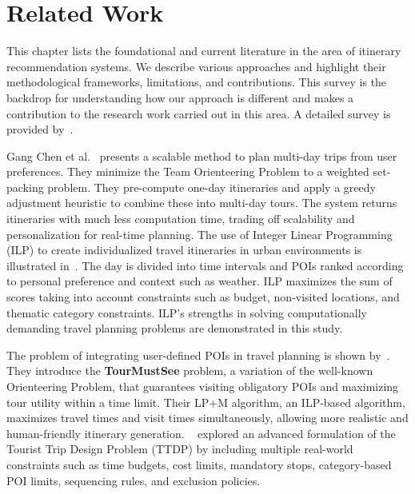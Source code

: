 \section{Related Work}

This chapter lists the foundational and current literature in the area of itinerary recommendation systems. We describe various approaches and highlight their methodological frameworks, limitations, and contributions. This survey is the backdrop for understanding how our approach is different and makes a contribution to the research work carried out in this area. A detailed survey is provided by~\cite{gavalas2014survey, sylejmani2011survey}.

Gang Chen et al.~\cite{chen2014automatic} presents a scalable method to plan multi-day trips from user preferences. They minimize the Team Orienteering Problem to a weighted set-packing problem. They pre-compute one-day itineraries and apply a greedy adjustment heuristic to combine these into multi-day tours. The system returns itineraries with much less computation time, trading off scalability and personalization for real-time planning. The use of Integer Linear Programming (ILP) to create individualized travel itineraries in urban environments is illustrated in~\cite{vanzelst2016itinerary}. The day is divided into time intervals and POIs ranked according to personal preference and context such as weather. ILP maximizes the sum of scores taking into account constraints such as budget, non-visited locations, and thematic category constraints. ILP's strengths in solving computationally demanding travel planning problems are demonstrated in this study.

The problem of integrating user-defined POIs in travel planning is shown by~\cite{taylor2018tour}. They introduce the \textbf{TourMustSee} problem, a variation of the well-known Orienteering Problem, that guarantees visiting obligatory POIs and maximizing tour utility within a time limit. Their LP+M algorithm, an ILP-based algorithm, maximizes travel times and visit times simultaneously, allowing more realistic and human-friendly itinerary generation. ~\cite{vu2022branch} explored an advanced formulation of the Tourist Trip Design Problem (TTDP) by including multiple real-world constraints such as time budgets, cost limits, mandatory stops, category-based POI limits, sequencing rules, and exclusion policies.

